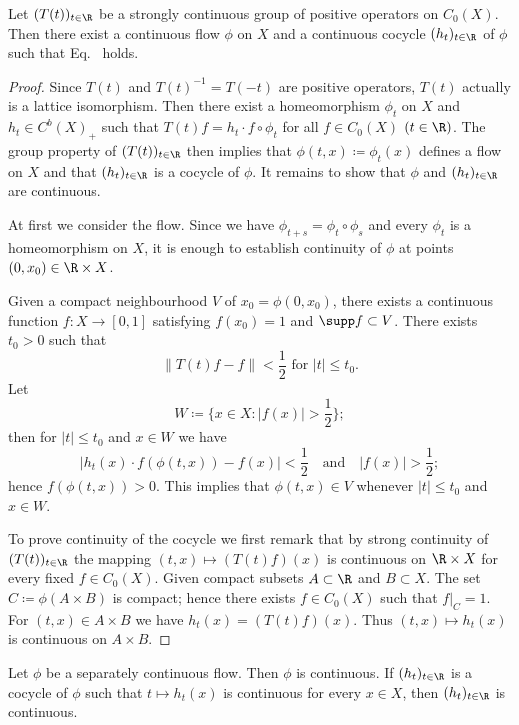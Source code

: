 \begin{proposition}\label{prop:b2-3.9}
Let $(T(t))_{t \in \R}$ be a strongly continuous group of positive operators on $C_0(X)$.
Then there exist a continuous flow $\phi$ on $X$ and a continuous cocycle $(h_t)_{t \in \R}$ of\/ $\phi$ such that Eq.~ holds.
\end{proposition}
\begin{proof}
Since $T(t)$ and $T(t)^{-1} = T(-t)$ are positive operators, $T(t)$ actually is a lattice isomorphism.
Then there exist a homeomorphism $\phi_t$ on $X$ and $h_t \in C^{b}(X)_+$ such that $T(t)f = h_t \cdot f \circ \phi_t$ for all $f \in C_0(X)$ $(t \in \R)$.
The group property of\/ $(T(t))_{t \in \R}$ then implies that $\phi(t,x) \coloneqq \phi_t(x)$ defines a flow on $X$ and that $(h_t)_{t \in \R}$ is a cocycle of\/ $\phi$.
It remains to show that $\phi$ and $(h_t)_{t \in \R}$ are continuous.

At first we consider the flow.
Since we have $\phi_{t+s} = \phi_t \circ \phi_s$ and every $\phi_t$ is a homeomorphism on $X$, it is enough to establish continuity of\/ $\phi$ at points $(0,x_0) \in \R \times X$.

Given a compact neighbourhood $V$ of\/ $x_0 = \phi (0,x_0)$, there exists a continuous function $f \colon X \to [0,1]$ satisfying $f(x_0) = 1$ and $\supp f \subset V$.
There exists $t_0 > 0$ such that 
%
\[
	\|T(t)f - f\| < \frac{1}{2} \text{ for  $|t| \leq t_0$}.
\]
%
Let 
%
\[
	W \coloneqq \{x \in X \colon |f(x)| > \frac{1}{2}\};
\]
%
then for $|t| \leq t_0$ and $x \in W$ we have 
%
\[
	|h_t(x) \cdot f(\phi(t,x)) - f(x)| < \frac{1}{2} \quad \text{and} \quad |f(x)| > \frac{1}{2};
\]
%
hence $f(\phi (t,x)) > 0$.
This implies that $\phi (t,x) \in V$ whenever $|t| \leq t_0$ and $x \in W$.

To prove continuity of the cocycle we first remark that by strong continuity of\/ $(T(t))_{t \in \R}$ 
the mapping $(t,x) \mapsto (T(t)f) (x)$ is continuous on $\R \times X$ for every fixed $f \in C_0(X)$.
Given compact subsets $A \subset \R $ and $B \subset X$.
The set $C \coloneqq \phi(A \times B)$ is compact; hence there exists $f \in C_0(X)$ such that $f|_{C} = 1$.
For $(t,x) \in A \times B$ we have $h_t(x) = (T(t)f) (x)$.
Thus $(t,x) \mapsto h_t(x)$ is continuous on $A \times B$.
\end{proof}
\begin{corollary}\label{cor:b2-3.10}
Let $\phi$ be a separately continuous flow.
Then $\phi$ is continuous.
If\/ $(h_t)_{t \in \R}$ is a cocycle of\/ $\phi$ such that $t \mapsto h_t (x)$ is continuous for every $x \in X$, then $(h_t)_{t \in \R}$ is continuous.
\end{corollary}
